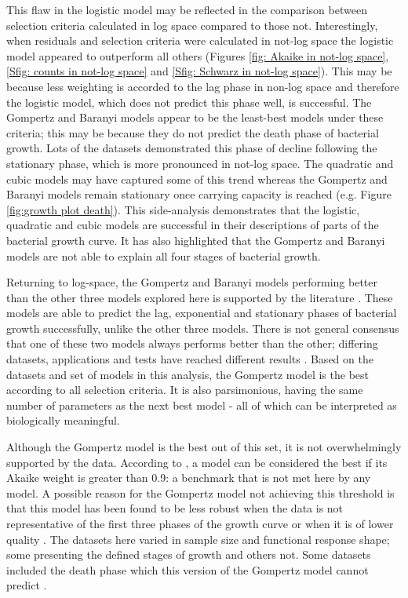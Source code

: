 \documentclass[11pt]{article}
\begin{document}
\begin{linenumbers}
        This flaw in the logistic model may be reflected in the comparison between selection criteria calculated in log space compared to those not. Interestingly, when residuals and selection criteria were calculated in not-log space the logistic model appeared to outperform all others (Figures \ref{fig: Akaike in not-log space}, \ref{Sfig: counts in not-log space} and \ref{Sfig: Schwarz in not-log space}). This may be because less weighting is accorded to the lag phase in non-log space and therefore the logistic model, which does not predict this phase well, is successful. The Gompertz and Baranyi models appear to be the least-best models under these criteria; this may be because they do not predict the death phase of bacterial growth. Lots of the datasets demonstrated this phase of decline following the stationary phase, which is more pronounced in not-log space. The quadratic and cubic models may have captured some of this trend whereas the Gompertz and Baranyi models remain stationary once carrying capacity is reached (e.g. Figure \ref{fig:growth plot death}). This side-analysis demonstrates that the logistic, quadratic and cubic models are successful in their descriptions of parts of the bacterial growth curve. It has also highlighted that the Gompertz and Baranyi models are not able to explain all four stages of bacterial growth.

        Returning to log-space, the Gompertz and Baranyi models performing better than the other three models explored here is supported by the literature \citep{zwietering_modeling_1990, mckellar_primary_2003}. These models are able to predict the lag, exponential and stationary phases of bacterial growth successfully, unlike the other three models. There is not general consensus that one of these two models always performs better than the other; differing datasets, applications and tests have reached different results \citep[e.g.][]{zwietering_modeling_1990, baranyi_non-autonomous_1993, buchanan_when_1997}. Based on the datasets and set of models in this analysis, the Gompertz model is the best according to all selection criteria. It is also parsimonious, having the same number of parameters as the next best model - all of which can be interpreted as biologically meaningful. 

        Although the Gompertz model is the best out of this set, it is not overwhelmingly supported by the data. According to \cite{johnson_model_2004}, a model can be considered the best if its Akaike weight is greater than 0.9: a benchmark that is not met here by any model. A possible reason for the Gompertz model not achieving this threshold is that this model has been found to be less robust when the data is not representative of the first three phases of the growth curve or when it is of lower quality \citep{mckellar_primary_2003, baty_estimating_2004}. The datasets here varied in sample size and functional response shape; some presenting the defined stages of growth and others not. Some datasets included the death phase which this version of the Gompertz model cannot predict \citep{chatterjee_antibacterial_2015}.



\end{linenumbers}
\end{document}
